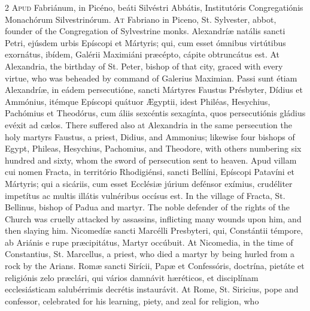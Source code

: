 \begin{paracol}{2}
\lettrine[lines=2]{A}{pud} Fabriánum, in 
 Picéno, beáti Silvéstri Abbátis, Institutóris Congregatiónis Monachórum 
 Silvestrinórum.
\switchcolumn
{}
\lettrine[lines=2]{A}{t} Fabriano in Piceno, St. 
 Sylvester, abbot, founder of the Congregation of Sylvestrine monks.
\switchcolumn*
{}
Alexandríæ natális 
 sancti Petri, ejúsdem urbis Epíscopi et Mártyris; qui, cum esset ómnibus 
 virtútibus exornátus, ibídem, Galérii Maximiáni præcépto, cápite obtruncátus 
 est.
\switchcolumn
{}
At Alexandria, the birthday of St. 
 Peter, bishop of that city, graced with every virtue, who was beheaded by 
 command of Galerius Maximian.
\switchcolumn*
{}
Passi sunt étiam 
 Alexandríæ, in eádem persecutióne, sancti Mártyres Faustus Présbyter, Dídius 
 et Ammónius, itémque Epíscopi quátuor Ægyptii, idest Philéas, Hesychius, 
 Pachómius et Theodórus, cum áliis sexcéntis sexagínta, quos persecutiónis 
 gládius evéxit ad cælos.
\switchcolumn
{}
There suffered also at Alexandria in 
 the same persecution the holy martyrs Faustus, a priest, Didius, and 
 Ammonius; likewise four bishops of Egypt, Phileas, Hesychius, Pachomius, and 
 Theodore, with others numbering six hundred and sixty, whom the sword of 
 persecution sent to heaven.
\switchcolumn*
{}
Apud villam cui nomen 
 Fracta, in território Rhodigiénsi, sancti Bellíni, Epíscopi Patavíni et 
 Mártyris; qui a sicáriis, cum esset Ecclésiæ júrium defénsor exímius, 
 crudéliter impetítus ac multis illátis vulnéribus occísus est.
\switchcolumn
{}
In the village of Fracta, St. 
 Bellinus, bishop of Padua and martyr. The noble defender of the rights 
 of the Church was cruelly attacked by assassins, inflicting many wounds upon 
 him, and then slaying him.
\switchcolumn*
{}
Nicomedíæ sancti 
 Marcélli Presbyteri, qui, Constántii témpore, ab Ariánis e rupe præcipitátus, 
 Martyr occúbuit.
\switchcolumn
{}
At Nicomedia, in the time of 
 Constantius, St. Marcellus, a priest, who died a martyr by being hurled from 
 a rock by the Arians.
\switchcolumn*
{}
Romæ sancti Sirícii, 
 Papæ et Confessóris, doctrína, pietáte et religiónis zelo præclári, qui 
 vários damnávit hæréticos, et disciplínam ecclesiásticam salubérrimis 
 decrétis instaurávit.
\switchcolumn
{}
At Rome, St. Siricius, pope and 
 confessor, celebrated for his learning, piety, and zeal for religion, who 

\end{paracol}
